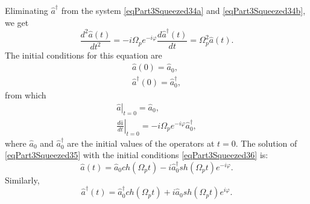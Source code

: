 Eliminating $\hat{a}^{\dag}$ from the system \eqref{eqPart3Squeezed34a} and
\eqref{eqPart3Squeezed34b}, we get
\begin{equation}
\frac{d^2\hat{a}\left(t\right)}{dt^2} = 
- i \Omega_p e^{- i \varphi}
\frac{d\hat{a}^{\dag}\left(t\right)}{dt} = 
\Omega_p^2\hat{a}\left(t\right).
\label{eqPart3Squeezed35}
\end{equation}
The initial conditions for this equation are
\begin{eqnarray}
\hat{a}\left(0\right) = \hat{a}_0, 
\nonumber \\
\hat{a}^{\dag}\left(0\right) = \hat{a}^{\dag}_0, 
\nonumber
\end{eqnarray}
from which
\begin{eqnarray}
\left.\hat{a}\right|_{t=0} = \hat{a}_0, 
\nonumber \\
\left.\frac{d\hat{a}}{dt}\right|_{t=0} = 
- i \Omega_p e^{- i \varphi} \hat{a}^{\dag}_0,
\label{eqPart3Squeezed36}
\end{eqnarray}
where $\hat{a}_0$ and $\hat{a}^{\dag}_0$ are the initial values of the operators at $t
= 0$. The solution of \eqref{eqPart3Squeezed35} with the initial
conditions \eqref{eqPart3Squeezed36} is:
\begin{equation}
\hat{a}\left(t\right) = \hat{a}_0 ch \left(\Omega_p t \right) - 
i \hat{a}^{\dag}_0 sh \left(\Omega_p t\right) e^{-i \varphi}.
\label{eqPart3Squeezed37a}
\end{equation}
Similarly,
\begin{equation}
\hat{a}^{\dag}\left(t\right) = \hat{a}^{\dag}_0 ch \left(\Omega_p t \right) +
i \hat{a}_0 sh \left(\Omega_p t\right) e^{i \varphi}.
\label{eqPart3Squeezed37b}
\end{equation}



